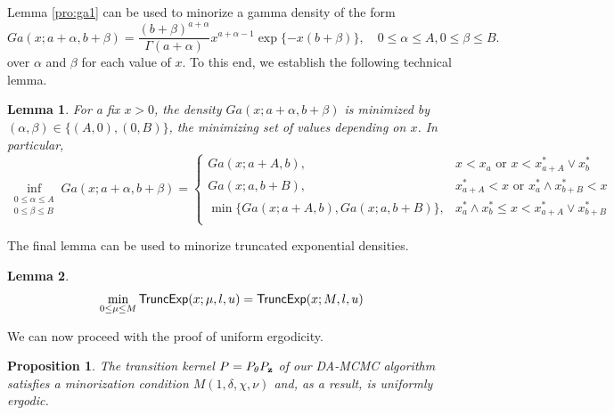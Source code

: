 \documentclass[11pt]{article}
\newtheorem{proposition}{Proposition}[section]
\newtheorem{lemma}{Lemma}[section]
\begin{document}
	
	Lemma \ref{pro:ga1} can be used to minorize a gamma density of the form
	\begin{equation}
		\label{eq:ga}
		Ga(x;a+\alpha,b+\beta) = \frac{(b+\beta)^{a+\alpha}}{\Gamma(a+\alpha)}x^{a+\alpha-1}\exp\{-x(b+\beta)\}, \quad 0\le\alpha\le A, 0\le\beta\le B.
	\end{equation}
	over $\alpha$ and $\beta$ for each value of $x$. To this end, we establish the following technical lemma.
	\begin{lemma}	
		\label{pro:ga2}
		For a fix $x>0$, the density $Ga(x;a+\alpha,b+\beta)$ is minimized by $(\alpha, \beta) \in \{(A, 0), (0, B)\}$, the minimizing set of values depending on $x$. In particular,	
		$$\inf_{\begin{aligned}
				0\le \alpha\le A \\ 0\le \beta\le B
		\end{aligned}}Ga(x;a+\alpha,b+\beta) = 
		\begin{cases}
			Ga(x;a+A,b)                     , & x<x_a         \text{ or } x<x_{a+A}^* \vee x_b^*\\
			Ga(x;a,b+B)                     , & x_{a+A}^* < x \text{ or } x_a^* \wedge x_{b+B}^* < x\\
			\min\{Ga(x;a+A,b), Ga(x;a,b+B)\}, & x_a^* \wedge x_b^*\le x < x_{a+A}^* \vee x_{b+B}^*\\
		\end{cases}$$
	\end{lemma}
	The final lemma can be used to minorize truncated exponential densities.
	\begin{lemma}
		\label{pro:tru}
		$$\min_{0 \le \mu \le M} \textsf{TruncExp}(x; \mu, l, u) = \textsf{TruncExp}(x; M, l, u) $$
	\end{lemma}
	
	We can now proceed with the proof of uniform ergodicity.
	\begin{proposition}
		\label{pro:uni}
		The transition kernel $P = P_{\theta}P_{\mathbf{z}}$ of our DA-MCMC algorithm satisfies a minorization condition $M(1, \delta, \chi, \nu)$ and, as a result, is uniformly ergodic.
	\end{proposition}
	
\end{document}
